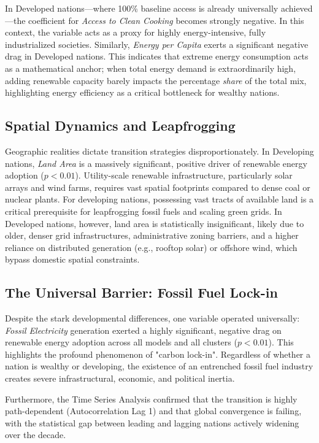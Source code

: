 \documentclass[a4paper,11pt]{article}
\begin{document}
In Developed nations—where 100\% baseline access is already universally achieved—the coefficient for \textit{Access to Clean Cooking} becomes strongly negative.
In this context, the variable acts as a proxy for highly energy-intensive, fully industrialized societies.
Similarly, \textit{Energy per Capita} exerts a significant negative drag in Developed nations.
This indicates that extreme energy consumption acts as a mathematical anchor; when total energy demand is extraordinarily high, adding renewable capacity barely impacts the percentage \textit{share} of the total mix, highlighting energy efficiency as a critical bottleneck for wealthy nations.

\subsection{Spatial Dynamics and Leapfrogging}
Geographic realities dictate transition strategies disproportionately.
In Developing nations, \textit{Land Area} is a massively significant, positive driver of renewable energy adoption ($p < 0.01$).
Utility-scale renewable infrastructure, particularly solar arrays and wind farms, requires vast spatial footprints compared to dense coal or nuclear plants.
For developing nations, possessing vast tracts of available land is a critical prerequisite for leapfrogging fossil fuels and scaling green grids.
In Developed nations, however, land area is statistically insignificant, likely due to older, denser grid infrastructures, administrative zoning barriers, and a higher reliance on distributed generation (e.g., rooftop solar) or offshore wind, which bypass domestic spatial constraints.

\subsection{The Universal Barrier: Fossil Fuel Lock-in}
Despite the stark developmental differences, one variable operated universally: \textit{Fossil Electricity} generation exerted a highly significant, negative drag on renewable energy adoption across all models and all clusters ($p < 0.01$).
This highlights the profound phenomenon of "carbon lock-in".
Regardless of whether a nation is wealthy or developing, the existence of an entrenched fossil fuel industry creates severe infrastructural, economic, and political inertia. 

Furthermore, the Time Series Analysis confirmed that the transition is highly path-dependent (Autocorrelation Lag 1) and that global convergence is failing, with the statistical gap between leading and lagging nations actively widening over the decade.
\end{document}
